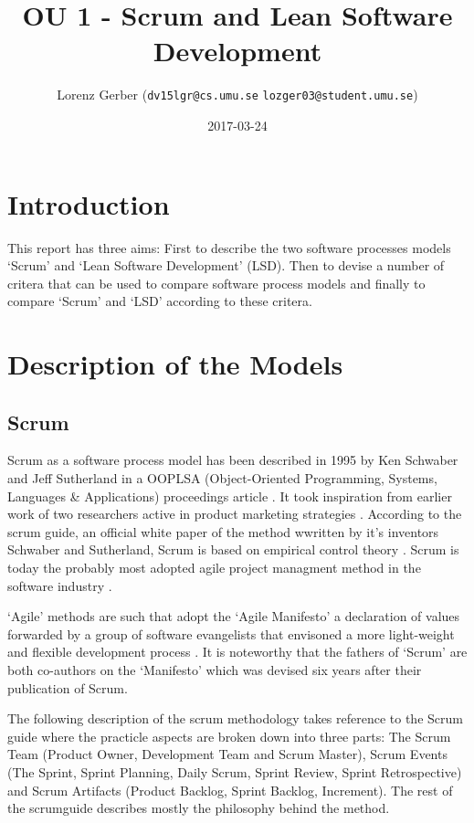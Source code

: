 \documentclass[a4paper,11pt,twoside]{article}
\title{OU 1 - Scrum and Lean Software Development}
\author{Lorenz Gerber ({\tt{dv15lgr@cs.umu.se}} {\tt{lozger03@student.umu.se}})}
\date{2017-03-24}
\begin{document}
\lstset{language=C}
\maketitle
\thispagestyle{empty}
\newpage

\clearpage
{}

\section{Introduction}
This report has three aims: First to describe the two software processes models `Scrum' and `Lean Software Development' (LSD). Then to devise a number of critera that can be used to compare software process models and finally to compare `Scrum' and `LSD' according to these critera.

\section{Description of the Models}
\subsection{Scrum}
Scrum as a software process model has been described in 1995 by Ken Schwaber and Jeff Sutherland in a OOPLSA (Object-Oriented Programming, Systems, Languages \& Applications) proceedings article \cite{oopsla1995}. It took inspiration from earlier work of two researchers active in product marketing strategies \cite{takeuchi1986}. According to the scrum guide, an official white paper of the method wwritten by it's inventors Schwaber and Sutherland, Scrum is based on empirical control theory \cite{scrumguide}. Scrum is today the probably most adopted agile project managment method in the software industry \cite[p. 86]{sommerville2016}.

`Agile' methods are such that adopt the `Agile Manifesto' a declaration of values forwarded by a group of software evangelists that envisoned a more light-weight and flexible development process \cite{manifesto}. It is noteworthy that the fathers of `Scrum' are both co-authors on the `Manifesto' which was devised six years after their publication of Scrum.

The following description of the scrum methodology takes reference to the Scrum guide \cite{scrumguide} where the practicle aspects are broken down into three parts: The Scrum Team (Product Owner, Development Team and Scrum Master), Scrum Events (The Sprint, Sprint Planning, Daily Scrum, Sprint Review, Sprint Retrospective) and Scrum Artifacts (Product Backlog, Sprint Backlog, Increment). The rest of the scrumguide describes mostly the philosophy behind the method.
\end{document}

